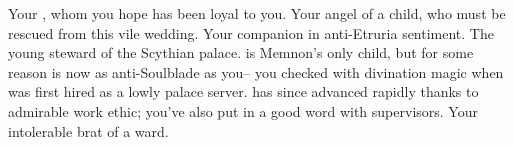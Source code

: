 \documentclass[char]{Kos}
\begin{document}
\begin{contacts}
\contact{\cScythiaKing{}} Your \cScythiaKing{\spouse}, whom you hope has been loyal to you.
\contact{\cBride{}} Your angel of a child, who must be rescued from this vile wedding.
\contact{\cArmsDealer{}} Your companion in anti-Etruria sentiment.
\contact{\cButler{}} The young steward of the Scythian palace. \cButler{\They} is Memnon's only child, but for some reason \cButler{\they} is now as anti-Soulblade as you-- you checked with divination magic when \cButler{\they} was first hired as a lowly palace server. \cButler{\They} has since advanced rapidly thanks to \cButler{\their} admirable work ethic; you've also put in a good word with \cButler{\their} supervisors.
\contact{\cWard{}} Your intolerable brat of a ward.
\end{contacts}
\end{document}
